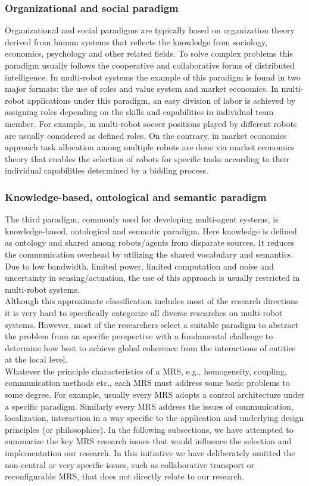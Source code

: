 \subsubsection*{Organizational and social paradigm}
Organizational and social paradigms are typically based on organization theory derived from human systems that reflects the knowledge from sociology, economics, psychology and other related fields. To solve complex problems this paradigm usually follows the cooperative and collaborative forms of distributed intelligence. In multi-robot systems the example of this paradigm is found in two major formats: 
the use of roles and value system and
market economics.
In multi-robot applications under this paradigm, an easy division of labor is achieved by assigning roles depending on the skills and capabilities in individual team member. For example, in multi-robot soccer \cite{Stone+1999,Asada+1999} positions played by different robots are usually considered as defined roles. On the contrary, in market economics approach \cite{Gerkey+2002,Dias+2006} task allocation among multiple robots are done via market economics theory that enables the selection of robots for specific tasks according to their individual capabilities determined by a bidding process.
\subsubsection*{Knowledge-based, ontological and semantic paradigm}
The third paradigm, commonly used for developing multi-agent systems, is knowledge-based, ontological and semantic paradigm. Here knowledge is defined as ontology and shared among robots/agents from disparate sources. It reduces the communication overhead by utilizing the shared vocabulary and semantics. Due to low bandwidth, limited power, limited computation and noise and uncertainty in sensing/actuation, the use of this approach is usually restricted in multi-robot systems. \\
Although this approximate classification includes most of the research directions it is very hard to specifically categorize all diverse researches on multi-robot systems. However, most of the researchers select a suitable paradigm to abstract the problem from an specific perspective with a fundamental challenge to determine how best to achieve global coherence from the interactions of entities at the local level. \\
%
Whatever the principle characteristics of a MRS, e.g., homogeneity, coupling, communication methods etc., each MRS must address some basic problems to some degree. For example, usually every MRS adopts a control architecture under a specific paradigm. Similarly every MRS address the issues of communication, localization, interaction in a way specific to the application and underlying design principles (or philosophies). In the following subsections, we have attempted to summarize the key MRS research issues that would influence the selection and implementation our research. In this initiative we have deliberately omitted the non-central or very specific issues, such as collaborative transport or reconfigurable MRS, that does not directly relate to our research.
